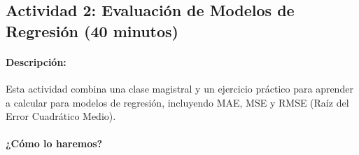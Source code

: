 \documentclass[a4,11pt]{aleph-notas}
\begin{document}
\subsection*{Actividad 2: Evaluación de Modelos de Regresión (40 minutos)}

\paragraph{Descripción:}  
Esta actividad combina una clase magistral y un
ejercicio práctico para aprender a calcular para modelos de regresión, incluyendo MAE, MSE y RMSE (Raíz del Error Cuadrático Medio).

\paragraph{¿Cómo lo haremos?}  
\end{document}
